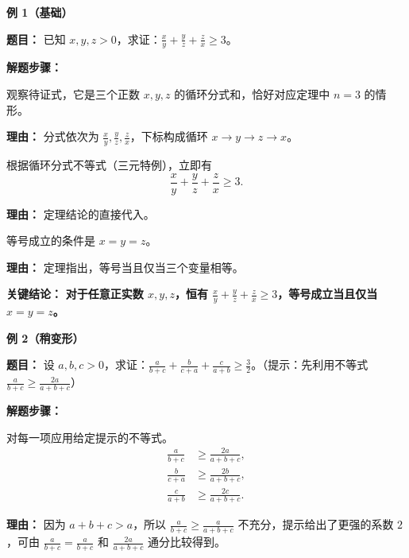 \begin{examplebox}
\textbf{\textcolor{CExample}{例 1（基础）}}

\textbf{\textcolor{CExample}{题目：}} 已知 $x, y, z > 0$，求证：$\frac{x}{y} + \frac{y}{z} + \frac{z}{x} \ge 3$。

\textbf{\textcolor{CExample}{解题步骤：}}
\begin{description}[style=nextline, leftmargin=2.8em, labelsep=0.5em, itemsep=0.45em]
    \item[\textbf{第一步（识别结构）：}] 观察待证式，它是三个正数 $x, y, z$ 的循环分式和，恰好对应定理中 $n=3$ 的情形。
    \par\textbf{理由：} 分式依次为 $\frac{x}{y}, \frac{y}{z}, \frac{z}{x}$，下标构成循环 $x \to y \to z \to x$。

    \item[\textbf{第二步（直接应用）：}] 根据循环分式不等式（三元特例），立即有
    \[
    \frac{x}{y} + \frac{y}{z} + \frac{z}{x} \ge 3.
    \]
    \par\textbf{理由：} 定理结论的直接代入。

    \item[\textbf{第三步（说明取等）：}] 等号成立的条件是 $x = y = z$。
    \par\textbf{理由：} 定理指出，等号当且仅当三个变量相等。
\end{description}

\textbf{\textcolor{CExample}{关键结论：}} \textbf{对于任意正实数 $x, y, z$，恒有 $\frac{x}{y} + \frac{y}{z} + \frac{z}{x} \ge 3$，等号成立当且仅当 $x=y=z$。}

\medskip
\textbf{\textcolor{CExample}{例 2（稍变形）}}

\textbf{\textcolor{CExample}{题目：}} 设 $a, b, c > 0$，求证：$\frac{a}{b+c} + \frac{b}{c+a} + \frac{c}{a+b} \ge \frac{3}{2}$。（提示：先利用不等式 $\frac{a}{b+c} \ge \frac{2a}{a+b+c}$）

\textbf{\textcolor{CExample}{解题步骤：}}
\begin{description}[style=nextline, leftmargin=2.8em, labelsep=0.5em, itemsep=0.45em]
    \item[\textbf{第一步（初步放缩）：}] 对每一项应用给定提示的不等式。
    \[
    \begin{aligned}
    \frac{a}{b+c} &\ge \frac{2a}{a+b+c}, \\
    \frac{b}{c+a} &\ge \frac{2b}{a+b+c}, \\
    \frac{c}{a+b} &\ge \frac{2c}{a+b+c}.
    \end{aligned}
    \]
    \par\textbf{理由：} 因为 $a+b+c > a$，所以 $\frac{a}{b+c} \ge \frac{a}{a+b+c}$ 不充分，提示给出了更强的系数 $2$，可由 $\frac{a}{b+c} = \frac{a}{b+c}$ 和 $\frac{2a}{a+b+c}$ 通分比较得到。


\end{description}
\end{examplebox}

